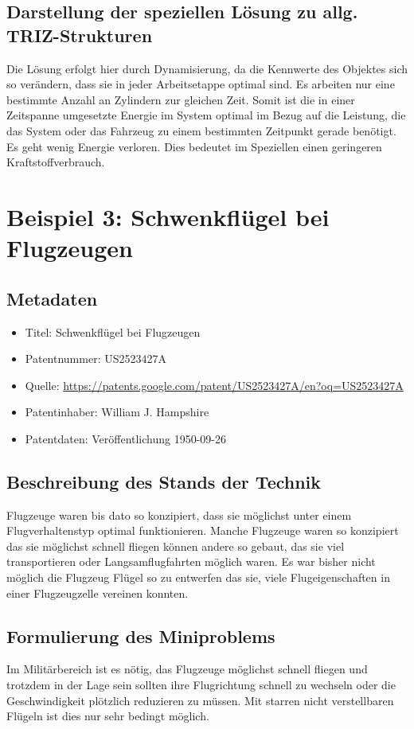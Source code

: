 \documentclass{article}
\begin{document}
\subsection{Darstellung der speziellen Lösung zu allg. TRIZ-Strukturen}
 
Die Lösung erfolgt hier durch Dynamisierung, da die Kennwerte des Objektes sich so verändern, dass sie in jeder Arbeitsetappe optimal sind. Es arbeiten nur eine bestimmte Anzahl an Zylindern zur gleichen Zeit. Somit ist die in einer Zeitspanne umgesetzte Energie im System optimal im Bezug auf die Leistung, die das System oder das Fahrzeug zu einem bestimmten Zeitpunkt gerade benötigt. Es geht wenig Energie verloren. Dies bedeutet im Speziellen einen geringeren Kraftstoffverbrauch.

\section{Beispiel 3: Schwenkflügel bei Flugzeugen}
\subsection{Metadaten}
\begin{itemize}\itemsep0pt
\item Titel: Schwenkflügel bei Flugzeugen
\item Patentnummer: US2523427A
\item Quelle: \url{https://patents.google.com/patent/US2523427A/en?oq=US2523427A}
\item Patentinhaber:  William J. Hampshire
\item Patentdaten: Veröffentlichung 1950-09-26
\end{itemize}

\subsection{Beschreibung des Stands der Technik}
Flugzeuge waren bis dato so konzipiert, dass sie möglichst unter einem Flugverhaltenstyp optimal funktionieren. Manche Flugzeuge waren so konzipiert das sie möglichst schnell fliegen können andere so gebaut, das sie viel transportieren oder Langsamflugfahrten möglich waren. Es war bisher nicht möglich die Flugzeug Flügel so zu entwerfen das sie, viele Flugeigenschaften in einer Flugzeugzelle vereinen konnten.
\subsection{Formulierung des Miniproblems}
Im Militärbereich ist es nötig, das Flugzeuge möglichst schnell fliegen und trotzdem in der Lage sein sollten ihre Flugrichtung schnell zu wechseln oder die Geschwindigkeit plötzlich reduzieren zu müssen. Mit starren nicht verstellbaren Flügeln ist dies nur sehr bedingt möglich. 
\end{document}
